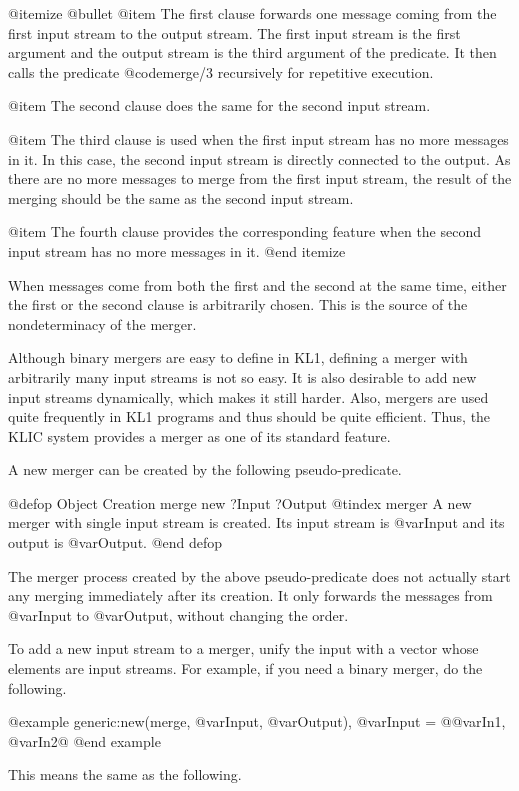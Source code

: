 {{@itemize @bullet
@item
The first clause forwards one message coming from the first input stream
to the output stream.  The first input stream is the first argument and
the output stream is the third argument of the predicate.  It then calls
the predicate @code{merge/3} recursively for repetitive execution.

@item
The second clause does the same for the second input stream.

@item
The third clause is used when the first input stream has no more messages
in it.  In this case, the second input stream is directly connected to
the output.  As there are no more messages to merge from the first input
stream, the result of the merging should be the same as the second input
stream.

@item
The fourth clause provides the corresponding feature when the second
input stream has no more messages in it.
@end itemize

When messages come from both the first and the second at the same time,
either the first or the second clause is arbitrarily chosen.  This is the
source of the nondeterminacy of the merger.

Although binary mergers are easy to define in KL1, defining a merger
with arbitrarily many input streams is not so easy.  It is also
desirable to add new input streams dynamically, which makes it still
harder.  Also, mergers are used quite frequently in KL1 programs and
thus should be quite efficient.  Thus, the KLIC system provides a merger
as one of its standard feature.

A new merger can be created by the following pseudo-predicate.

@defop {Object Creation} merge new ?Input ?Output
@tindex merger
A new merger with single input stream is created.  Its input stream is
@var{Input} and its output is @var{Output}.
@end defop

The merger process created by the above pseudo-predicate does not
actually start any merging immediately after its creation.  It only
forwards the messages from @var{Input} to @var{Output}, without changing
the order.

To add a new input stream to a merger, unify the input with a vector
whose elements are input streams.  For example, if you need a binary
merger, do the following.

@example
generic:new(merge, @var{Input}, @var{Output}),
@var{Input} = @{@var{In1}, @var{In2}@}
@end example

This means the same as the following.

}}
